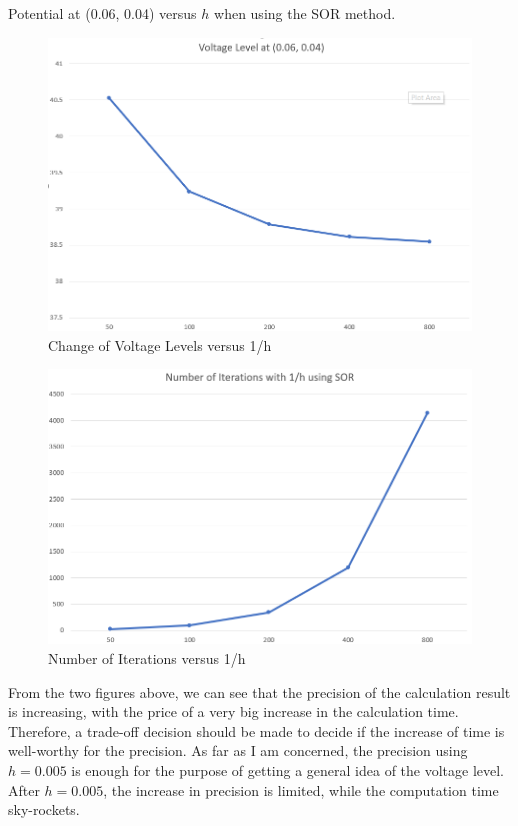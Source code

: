 \documentclass[a4paper,titlepage]{article}
\begin{document}
			\begin{table}[!htb]
				\centering
				\caption{Potential at (0.06, 0.04) versus $h$ when using the SOR method.}
				\label{table:h_result}
			\end{table}
			\begin{figure}[!h]
				\centering
				\includegraphics[width=\linewidth]{vol_1h_sor}
				\caption{Change of Voltage Levels versus 1/h}
				\label{vol_1h_sor}
			\end{figure}
			\begin{figure}[!h]
				\centering
				\includegraphics[width=\linewidth]{iter_1h_sor}
				\caption{Number of Iterations versus 1/h}
				\label{iter_1h_sor}
			\end{figure}
		
			From the two figures above, we can see that the precision of the calculation result is increasing, with the price of a very big increase in the calculation time. Therefore, a trade-off decision should be made to decide if the increase of time is well-worthy for the precision. As far as I am concerned, the precision using $h = 0.005$ is enough for the purpose of getting a general idea of the voltage level. After $h = 0.005$, the increase in precision is limited, while the computation time sky-rockets.
\end{document}

